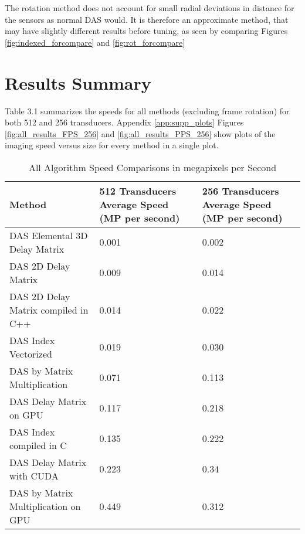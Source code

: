 
    The rotation method does not account for small radial deviations in distance for the sensors as normal DAS would. It is therefore an approximate method, that may have slightly different results before tuning, as seen by comparing Figures \ref{fig:indexed_forcompare} and \ref{fig:rot_forcompare}


\section{Results Summary}
\label{chapter3:summary}

Table 3.1 summarizes the speeds for all methods (excluding frame rotation) for both 512 and 256 transducers. Appendix \ref{app:supp_plots} Figures \ref{fig:all_results_FPS_256} and \ref{fig:all_results_PPS_256} show plots of the imaging speed versus size for every method in a single plot.

\begin{table}[!ht]
    \caption{All Algorithm Speed Comparisons in megapixels per Second}
    \centering
    \begin{tabular}{|p{2in}|M{1.8in}|M{1.8in}|}
        \hline
        Method & 512 Transducers Average Speed (MP per second) & 256 Transducers Average Speed (MP per second) \\ \hline
        DAS Elemental 3D Delay Matrix & 0.001 & 0.002 \\ \hline
        DAS 2D Delay Matrix & 0.009 & 0.014 \\ \hline
        DAS 2D Delay Matrix compiled in C++ & 0.014 & 0.022 \\ \hline
        DAS Index Vectorized & 0.019 & 0.030 \\ \hline
        DAS by Matrix Multiplication & 0.071 & 0.113 \\ \hline
        DAS Delay Matrix on GPU & 0.117 & 0.218 \\ \hline
        DAS Index compiled in C & 0.135 & 0.222 \\ \hline
        DAS Delay Matrix with CUDA & 0.223 & 0.34 \\ \hline
        DAS by Matrix Multiplication on GPU & 0.449 & 0.312 \\ \hline
    \end{tabular}
\end{table}

